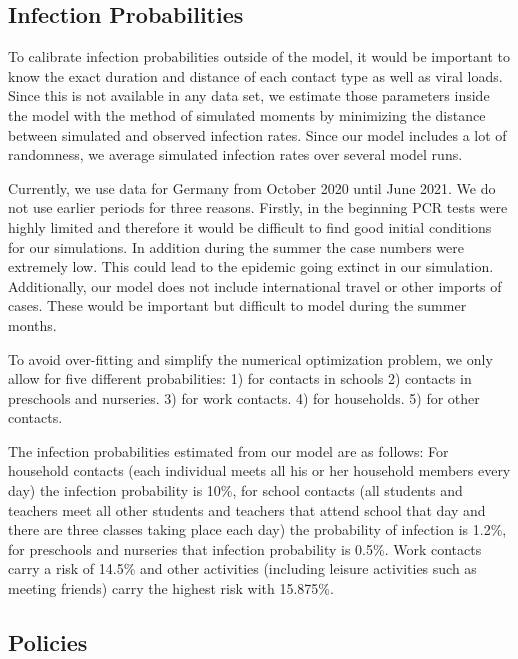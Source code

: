 \subsection{Infection Probabilities}
\label{sec:estimation}

To calibrate infection probabilities outside of the model, it would be important to know
the exact duration and distance of each contact type as well as viral loads. Since this
is not available in any data set, we estimate those parameters inside the model with the
method of simulated moments \citep{McFadden1989} by minimizing the distance between
simulated and observed infection rates. Since our model includes a lot of randomness, we
average simulated infection rates over several model runs.

Currently, we use data for Germany from October 2020 until June 2021. We do not use
earlier periods for three reasons. Firstly, in the beginning PCR tests were highly
limited and therefore it would be difficult to find good initial conditions for our
simulations. In addition during the summer the case numbers were extremely low. This
could lead to the epidemic going extinct in our simulation. Additionally, our model does
not include international travel or other imports of cases. These would be important but
difficult to model during the summer months.

To avoid over-fitting and simplify the numerical optimization problem, we only allow for
five different probabilities: 1) for contacts in schools 2) contacts in preschools and
nurseries. 3) for work contacts. 4) for households. 5) for other contacts.

The infection probabilities estimated from our model are as follows: For household
contacts (each individual meets all his or her household members every day) the infection
probability is 10\%, for school contacts (all students and teachers meet all other
students and teachers that attend school that day and there are three classes taking
place each day) the probability of infection is 1.2\%, for preschools and nurseries that
infection probability is 0.5\%. Work contacts carry a risk of 14.5\% and other activities
(including leisure activities such as meeting friends) carry the highest risk with
15.875\%.




\subsection{Policies}

